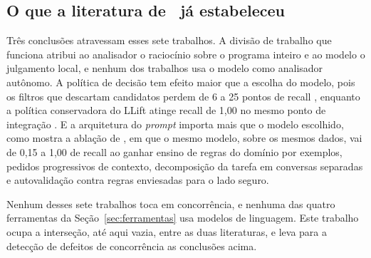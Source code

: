 \subsection{O que a literatura de \llm\ já estabeleceu}

Três conclusões atravessam esses sete trabalhos. A divisão de trabalho que
funciona atribui ao analisador o raciocínio sobre o programa inteiro e ao
modelo o julgamento local, e nenhum dos trabalhos usa o modelo como analisador
autônomo. A política de decisão tem efeito maior que a escolha do modelo, pois os
filtros que descartam candidatos perdem de 6 a 25 pontos de recall
\cite{reducing-fp,adataint}, enquanto a política conservadora do LLift atinge
recall de 1,00 no mesmo ponto de integração \cite{llift}. E a arquitetura do
\textit{prompt} importa mais que o modelo escolhido, como mostra a ablação de
, em que o mesmo modelo, sobre os mesmos dados, vai de 0,15 a
1,00 de recall ao ganhar ensino de regras do domínio por exemplos, pedidos
progressivos de contexto, decomposição da tarefa em conversas separadas e
autovalidação contra regras enviesadas para o lado seguro.

Nenhum desses sete trabalhos toca em concorrência, e nenhuma das quatro
ferramentas da Seção~\ref{sec:ferramentas} usa modelos de linguagem. Este
trabalho ocupa a interseção, até aqui vazia, entre as duas literaturas, e leva
para a detecção de defeitos de concorrência as conclusões acima.
